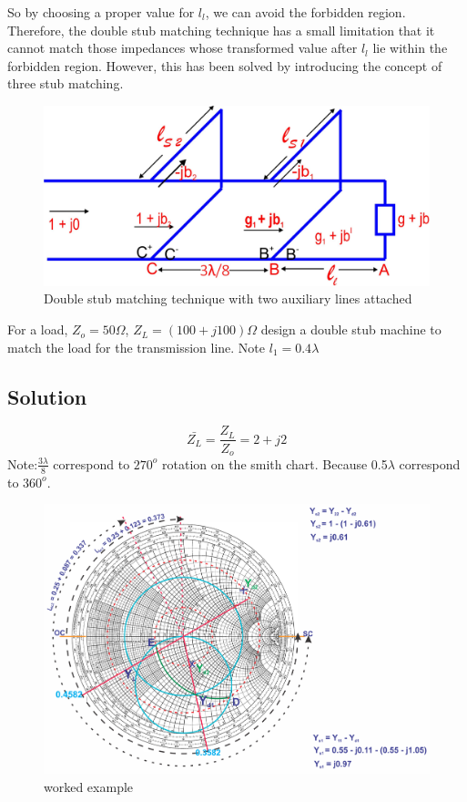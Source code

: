 \begin{enumerate}[(i)]
So by choosing a proper value for $l_l$, we can avoid the forbidden region. Therefore, the double stub matching technique has a small limitation that it cannot match those impedances whose transformed value after $l_l$ lie within the forbidden region. However, this has been solved by introducing the concept of three stub matching.
\begin{figure}[h]
\centering
\includegraphics[width=1\linewidth]{./graphics/fig12}
\caption{Double stub matching technique with two auxiliary lines attached}
\end{figure} 

\begin{exmp}
For a load, $Z_{o} = 50\Omega$, $Z_{L} = (100 + j100)\Omega$ design a double stub machine to match the load for the transmission line. Note $l_{1} = 0.4\lambda$
\subsection*{Solution}
$$\bar{Z_{L}} = \frac{Z_{L}}{Z_{o}} = 2 + j2$$
Note:$\frac{3\lambda}{8}$ correspond to $270^{o} $ rotation on the smith chart. Because 0.5$\lambda$ correspond to $ 360^{o}$. 
\begin{figure}[h]
\centering
\includegraphics[width=1\linewidth]{./graphics/question1}
\caption{worked example}
\end{figure}
				

\end{exmp}
\end{enumerate}
